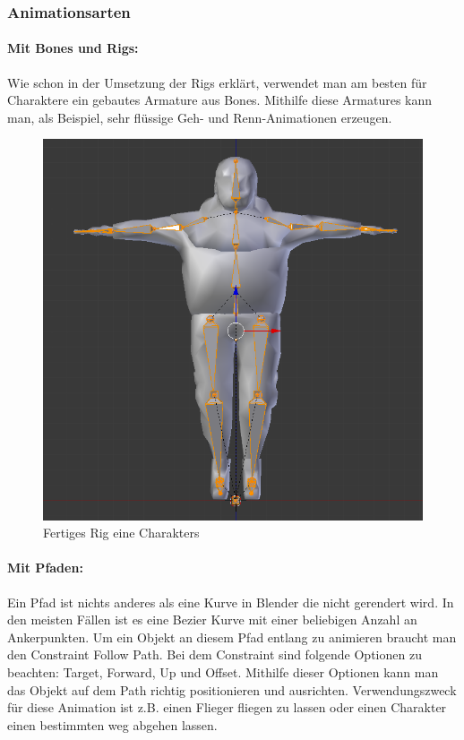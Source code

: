 \subsubsection{Animationsarten}

\paragraph{Mit Bones und Rigs:}
Wie schon in der Umsetzung der Rigs erklärt, verwendet man am besten für Charaktere ein gebautes Armature aus Bones.
Mithilfe diese Armatures kann man, als Beispiel, sehr flüssige Geh- und Renn-Animationen erzeugen.

\begin{figure}[H]
    \centering

    \includegraphics[width=.8\textwidth]{images/rigging_body.PNG}
    \caption{Fertiges Rig eine Charakters}
\end{figure}

\paragraph{Mit Pfaden:}
Ein Pfad ist nichts anderes als eine Kurve in Blender die nicht gerendert wird. In den meisten Fällen ist es eine Bezier Kurve mit einer beliebigen
Anzahl an Ankerpunkten. Um ein Objekt an diesem Pfad entlang zu animieren braucht man den Constraint \dq Follow Path\dq.
Bei dem Constraint sind folgende Optionen zu beachten: Target, Forward, Up und Offset. Mithilfe dieser Optionen kann man das Objekt auf dem Path richtig positionieren und ausrichten.
Verwendungszweck für diese Animation ist z.B. einen Flieger fliegen zu lassen oder einen Charakter einen bestimmten weg abgehen lassen.

